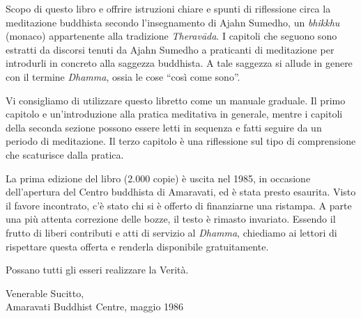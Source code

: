 
\vspace*{0.3\onelineskip}
Scopo di questo libro e offrire istruzioni chiare e spunti di
riflessione circa la meditazione buddhista secondo l'insegnamento di
Ajahn Sumedho, un \textit{bhikkhu} (monaco) appartenente alla tradizione
\textit{Theravāda}. I capitoli che seguono sono estratti da discorsi
tenuti da Ajahn Sumedho a praticanti di meditazione per introdurli in
concreto alla saggezza buddhista. A tale saggezza si allude in genere
con il termine \textit{Dhamma}, ossia le cose ``così come sono''.

Vi consigliamo di utilizzare questo libretto come un manuale graduale.
Il primo capitolo e un'introduzione alla pratica meditativa in generale,
mentre i capitoli della seconda sezione possono essere letti in sequenza
e fatti seguire da un periodo di meditazione. Il terzo capitolo è una
riflessione sul tipo di comprensione che scaturisce dalla pratica.

La prima edizione del libro (2.000 copie) è uscita nel 1985, in
occasione dell'apertura del Centro buddhista di Amaravati, ed è stata
presto esaurita. Visto il favore incontrato, c'è stato chi si è offerto
di finanziarne una ristampa. A parte una più attenta correzione delle
bozze, il testo è rimasto invariato. Essendo il frutto di liberi
contributi e atti di servizio al \textit{Dhamma}, chiediamo ai lettori di
rispettare questa offerta e renderla disponibile gratuitamente.

Possano tutti gli esseri realizzare la Verità.

\bigskip
{\par\raggedleft
Venerable Sucitto,\\
Amaravati Buddhist Centre, maggio 1986\\
\par}

